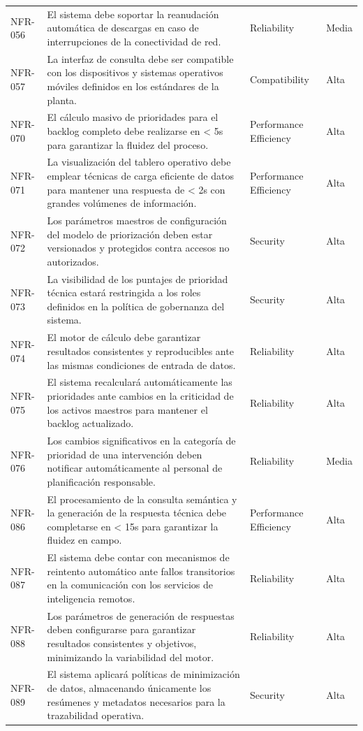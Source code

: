 \begin{longtable}{>{\raggedright\arraybackslash}p{} >{\raggedright\arraybackslash}p{} >{\raggedright\arraybackslash}p{} >{\raggedright\arraybackslash}p{}}
NFR-056 & El sistema debe soportar la reanudación automática de descargas en caso de interrupciones de la conectividad de red. & Reliability & Media \\
NFR-057 & La interfaz de consulta debe ser compatible con los dispositivos y sistemas operativos móviles definidos en los estándares de la planta. & Compatibility & Alta \\
NFR-070 & El cálculo masivo de prioridades para el backlog completo debe realizarse en < 5s para garantizar la fluidez del proceso. & Performance Efficiency & Alta \\
NFR-071 & La visualización del tablero operativo debe emplear técnicas de carga eficiente de datos para mantener una respuesta de < 2s con grandes volúmenes de información. & Performance Efficiency & Alta \\
NFR-072 & Los parámetros maestros de configuración del modelo de priorización deben estar versionados y protegidos contra accesos no autorizados. & Security & Alta \\
NFR-073 & La visibilidad de los puntajes de prioridad técnica estará restringida a los roles definidos en la política de gobernanza del sistema. & Security & Alta \\
NFR-074 & El motor de cálculo debe garantizar resultados consistentes y reproducibles ante las mismas condiciones de entrada de datos. & Reliability & Alta \\
NFR-075 & El sistema recalculará automáticamente las prioridades ante cambios en la criticidad de los activos maestros para mantener el backlog actualizado. & Reliability & Alta \\
NFR-076 & Los cambios significativos en la categoría de prioridad de una intervención deben notificar automáticamente al personal de planificación responsable. & Reliability & Media \\
NFR-086 & El procesamiento de la consulta semántica y la generación de la respuesta técnica debe completarse en < 15s para garantizar la fluidez en campo. & Performance Efficiency & Alta \\
NFR-087 & El sistema debe contar con mecanismos de reintento automático ante fallos transitorios en la comunicación con los servicios de inteligencia remotos. & Reliability & Alta \\
NFR-088 & Los parámetros de generación de respuestas deben configurarse para garantizar resultados consistentes y objetivos, minimizando la variabilidad del motor. & Reliability & Alta \\
NFR-089 & El sistema aplicará políticas de minimización de datos, almacenando únicamente los resúmenes y metadatos necesarios para la trazabilidad operativa. & Security & Alta \\

\end{longtable}
